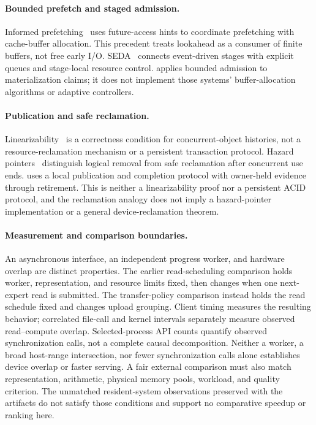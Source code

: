 \paragraph{Bounded prefetch and staged admission.}
Informed prefetching~\cite{patterson1995informed} uses future-access hints to
coordinate prefetching with cache-buffer allocation. This precedent treats
lookahead as a consumer of finite buffers, not free early I/O.
SEDA~\cite{welsh2001seda} connects event-driven stages with explicit queues
and stage-local resource control. \system{} applies bounded admission to
materialization claims; it does not implement those systems' buffer-allocation
algorithms or adaptive controllers.

\paragraph{Publication and safe reclamation.}
Linearizability~\cite{herlihy1990linearizability} is a correctness condition
for concurrent-object histories, not a resource-reclamation mechanism or a
persistent transaction protocol. Hazard pointers~\cite{michael2004hazard}
distinguish logical removal from safe reclamation after concurrent use ends.
\system{} uses a local publication and completion protocol with owner-held
evidence through retirement. This is neither a linearizability proof nor a
persistent ACID protocol, and the reclamation analogy does not imply a
hazard-pointer implementation or a general device-reclamation theorem.

\paragraph{Measurement and comparison boundaries.}
An asynchronous interface, an independent progress worker, and hardware
overlap are distinct properties. The earlier read-scheduling comparison holds
worker, representation, and resource limits fixed, then changes when one
next-expert read is submitted. The transfer-policy comparison instead holds
the read schedule fixed and changes upload grouping. Client timing measures
the resulting behavior; correlated file-call and kernel intervals separately
measure observed read--compute overlap. Selected-process API counts quantify
observed synchronization calls, not a complete causal decomposition. Neither
a worker, a broad host-range intersection, nor fewer synchronization calls
alone establishes device overlap or faster serving. A fair external comparison
must also match representation, arithmetic, physical memory pools, workload,
and quality criterion. The unmatched resident-system observations preserved
with the artifacts do not satisfy those conditions and support no comparative
speedup or ranking here.

